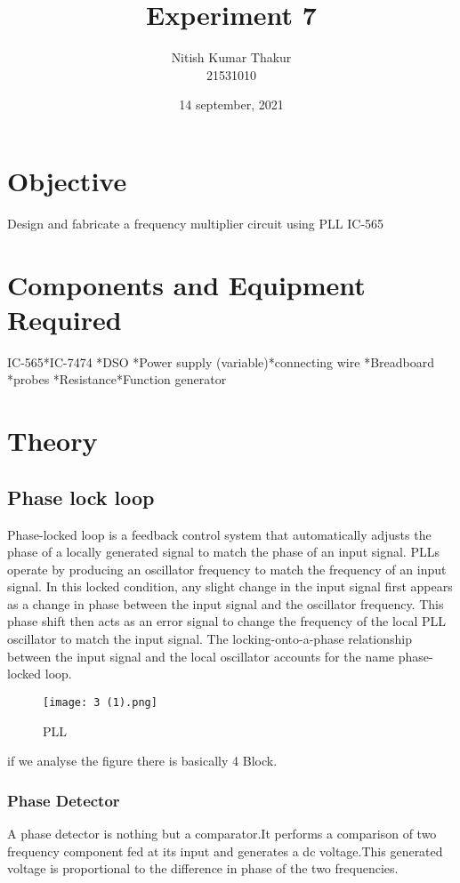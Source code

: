 \documentclass{article}
\title{Experiment 7}
\author{Nitish Kumar Thakur \\ 21531010 }
\date{14 september, 2021}
\begin{document}
\maketitle

\section{Objective}
Design and fabricate a frequency multiplier circuit using PLL IC-565
 
 \section{Components and Equipment Required}                    
 IC-565*IC-7474 *DSO *Power supply (variable)*connecting wire *Breadboard *probes *Resistance*Function generator
 
 
\section{Theory}

\subsection{Phase lock loop}
Phase-locked loop is a feedback control system that automatically adjusts the phase of a locally generated signal to match the phase of an input signal. PLLs operate by producing an oscillator frequency to match the frequency of an input signal. In this locked condition, any slight change in the input signal first appears as a change in phase between the input signal and the oscillator frequency. This phase shift then acts as an error signal to change the frequency of the local PLL oscillator to match the input signal. The locking-onto-a-phase relationship between the input signal and the local oscillator accounts for the name phase-locked loop.
\begin{figure*}[h]
	\centering
	\texttt{[image: 3 (1).png]}
	\caption{PLL}
	\label{FBD}
\end{figure*}
if we analyse the figure there is basically 4 Block.
\subsubsection{Phase Detector}
A phase detector is nothing but a comparator.It performs a comparison of two frequency component fed at its input and generates a dc voltage.This generated voltage is proportional to the difference in phase of the two frequencies.
\end{document}
